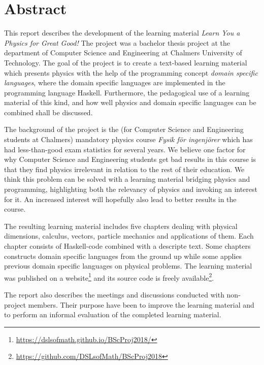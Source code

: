 \setlength{\parskip}{0.5cm}

\thispagestyle{plain}			%
\section*{Abstract}

This report describes the development of the learning material \textit{Learn You a Physics for Great Good!} The project was a bachelor thesis project at the department of Computer Science and Engineering at Chalmers University of Technology. The goal of the project is to create a text-based learning material which presents physics with the help of the programming concept \textit{domain specific languages}, where the domain specific languages are implemented in the programming language Haskell. Furthermore, the pedagogical use of a learning material of this kind, and how well physics and domain specific languages can be combined shall be discussed.

The background of the project is the (for Computer Science and Engineering students at Chalmers) mandatory physics course \textit{Fysik för ingenjörer} which has had less-than-good exam statistics for several years. We believe one factor for why Computer Science and Engineering students get bad results in this course is that they find physics irrelevant in relation to the rest of their education. We think this problem can be solved with a learning material bridging physics and programming, highlighting both the relevancy of physics and invoking an interest for it. An increased interest will hopefully also lead to better results in the course.

The resulting learning material includes five chapters dealing with physical dimensions, calculus, vectors, particle mechanics and applications of them. Each chapter consists of Haskell-code combined with a descripte text. Some chapters constructs domain specific languages from the ground up while some applies previous domain specific languages on physical problems. The learning material was published on a website\footnote{\url{https://dslsofmath.github.io/BScProj2018/}} and its source code is freely available\footnote{\url{https://github.com/DSLsofMath/BScProj2018}}.

The report also describes the meetings and discussions conducted with non-project members. Their purpose have been to improve the learning material and to perform an informal evaluation of the completed learning material.

